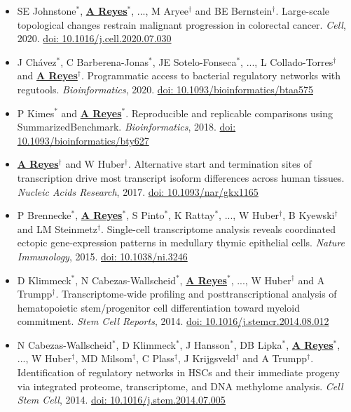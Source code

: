 \documentclass[11pt,a4paper,sans]{moderncv} %
\begin{document}
\begin{itemize}
\item SE Johnstone$^{\ast}$, \textbf{\underline{A Reyes}}$^{\ast}$,
  ..., M Aryee$^{\dagger}$ and BE Bernstein$^{\dagger}$. Large-scale topological changes restrain malignant progression in colorectal cancer. \textit{Cell}, 2020. \href{https://doi.org/10.1016/j.cell.2020.07.030}{doi: 10.1016/j.cell.2020.07.030}
\item J Ch\'avez$^{\ast}$, C Barberena-Jonas$^{\ast}$, JE Sotelo-Fonseca$^{\ast}$, ..., L Collado-Torres$^{\dagger}$ and \textbf{\underline{A Reyes}}$^{\dagger}$. Programmatic access to bacterial regulatory networks with regutools. \textit{Bioinformatics}, 2020. \href{https://doi.org/10.1093/bioinformatics/btaa575}{doi: 10.1093/bioinformatics/btaa575}
\item P Kimes$^{\ast}$ and \textbf{\underline{A Reyes}}$^{\ast}$. Reproducible and replicable comparisons using SummarizedBenchmark. \textit{Bioinformatics}, 2018. \href{https://doi.org/10.1093/bioinformatics/bty627}{doi: 10.1093/bioinformatics/bty627}
\item \textbf{\underline{A Reyes}}$^{\dagger}$ and W Huber$^{\dagger}$. Alternative start and termination sites of transcription drive most transcript isoform differences across human tissues. \textit{Nucleic Acids Research}, 2017. \href{https://doi.org/10.1093/nar/gkx1165}{doi: 10.1093/nar/gkx1165}
\item P Brennecke$^{\ast}$, \textbf{\underline{A Reyes}}$^{\ast}$, S Pinto$^{\ast}$, K Rattay$^{\ast}$, ..., W Huber$^{\dagger}$, B Kyewski$^{\dagger}$ and LM Steinmetz$^{\dagger}$. Single-cell transcriptome analysis reveals coordinated ectopic gene-expression patterns in medullary thymic epithelial cells. \textit{Nature Immunology}, 2015. \href{https://doi.org/10.1038/ni.3246}{doi: 10.1038/ni.3246}
\item D Klimmeck$^{\ast}$, N Cabezas-Wallscheid$^{\ast}$, \textbf{\underline{A Reyes}}$^{\ast}$, ..., W Huber$^{\dagger}$ and A Trumpp$^{\dagger}$. Transcriptome-wide profiling and posttranscriptional analysis of hematopoietic stem/progenitor cell differentiation toward myeloid commitment. \textit{Stem Cell Reports}, 2014. \href{https://doi.org/10.1016/j.stemcr.2014.08.012}{doi: 10.1016/j.stemcr.2014.08.012}
\item N Cabezas-Wallscheid$^{\ast}$, D Klimmeck$^{\ast}$, J Hansson$^{\ast}$, DB Lipka$^{\ast}$, \textbf{\underline{A Reyes}}$^{\ast}$, ..., W Huber$^{\dagger}$, MD Milsom$^{\dagger}$, C Plass$^{\dagger}$, J Krijgsveld$^{\dagger}$ and A Trumpp$^{\dagger}$. Identification of regulatory networks in HSCs and their immediate progeny via integrated proteome, transcriptome, and DNA methylome analysis. \textit{Cell Stem Cell}, 2014. \href{https://doi.org/10.1016/j.stem.2014.07.005}{doi: 10.1016/j.stem.2014.07.005}

\end{itemize}
\end{document}
